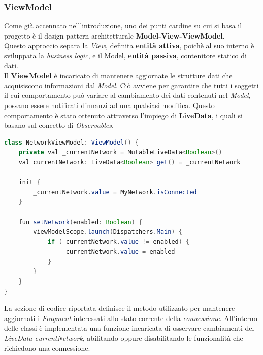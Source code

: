 \documentclass{article}
\begin{document}
    \subsubsection*{ViewModel}
    Come già accennato nell'introduzione, uno dei punti cardine su cui si basa il progetto è il design pattern architetturale \textbf{Model-View-ViewModel}. \\
    Questo approccio separa la \textit{View}, definita \textbf{entità attiva}, poichè al suo interno è sviluppata la \textit{business logic}, e il Model, \textbf{entità passiva}, contenitore statico di dati. \vspace*{7pt}\\
    Il \textbf{ViewModel} è incaricato di mantenere aggiornate le strutture dati che acquisiscono informazioni dal \textit{Model}. Ciò avviene per garantire che tutti i soggetti il cui comportamento può variare al cambiamento dei dati contenuti nel \textit{Model}, possano essere notificati dinnanzi ad una qualsiasi modifica. Questo comportamento è stato ottenuto attraverso l'impiego di \textbf{LiveData}, i quali si basano sul concetto di \textit{Observables}.
    \begin{lstlisting}[language = JAVA]
class NetworkViewModel: ViewModel() {
    private val _currentNetwork = MutableLiveData<Boolean>()
    val currentNetwork: LiveData<Boolean> get() = _currentNetwork

    init {
        _currentNetwork.value = MyNetwork.isConnected
    }

    fun setNetwork(enabled: Boolean) {
        viewModelScope.launch(Dispatchers.Main) {
            if (_currentNetwork.value != enabled) {
                _currentNetwork.value = enabled
            }
        }
    }
}
    \end{lstlisting}
    La sezione di codice riportata definisce il metodo utilizzato per mantenere aggiornati i \textit{Fragment} interessati allo stato corrente della \textit{connessione}. All'interno delle classi è implementata una funzione incaricata di osservare cambiamenti del \textit{LiveData currentNetwork}, abilitando oppure disabilitando le funzionalità che richiedono una connessione.
\end{document}

